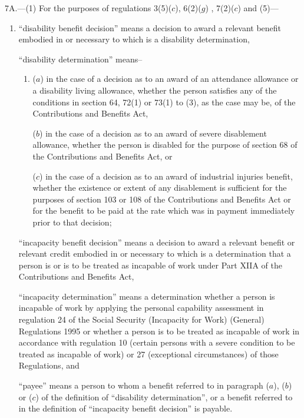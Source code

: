 \documentclass[12pt,a4paper]{article}
\begin{document}
7A.---(1)  For the purposes of regulations 3(5)($c$), 6(2)($g$)%
, 7(2)($c$) and (5)---  %
\begin{enumerate}\item[]
“disability benefit decision” means a decision to award a relevant benefit embodied in or necessary to which is a disability determination,

“disability determination” means–
\begin{enumerate}\item[]
($a$)
in the case of a decision as to an award of an attendance allowance or a disability living allowance, whether the person satisfies any of the conditions in section 64, 72(1) or 73(1) to (3), as the case may be, of the Contributions and Benefits Act,

($b$)
in the case of a decision as to an award of severe disablement allowance, whether the person is disabled for the purpose of section 68 of the Contributions and Benefits Act, or

($c$)
in the case of a decision as to an award of industrial injuries benefit, whether the existence or extent of any disablement is sufficient for the purposes of section 103 or 108 of the Contributions and Benefits Act or for the benefit to be paid at the rate which was in payment immediately prior to that decision;
\end{enumerate}

“incapacity benefit decision” means a decision to award a relevant benefit 
or relevant credit  %
embodied in or necessary to which is a determination that a person is or is to be treated as incapable of work under Part XIIA of the Contributions and Benefits Act,

\begin{sloppypar}
“incapacity determination” means a determination whether a person is incapable of work by applying the 
personal capability assessment  %
in regulation 24 of the Social Security (Incapacity for Work) (General) Regulations 1995 or whether a person is to be treated as incapable of work in accordance with regulation 10 (certain persons with a severe condition to be treated as incapable of work) or 27 (exceptional circumstances) of those Regulations, and
\end{sloppypar}

“payee” means a person to whom a benefit referred to in paragraph ($a$), ($b$) or ($c$) of the definition of “disability determination”, or a benefit referred to in the definition of “incapacity benefit decision” is payable.
\end{enumerate}
\end{document}
